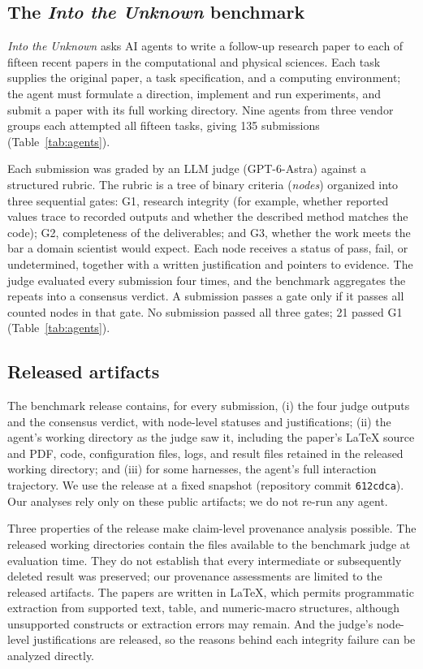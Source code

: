 \documentclass[preprint,12pt,authoryear]{elsarticle}
\begin{document}
\subsection{The \emph{Into the Unknown} benchmark}

\emph{Into the Unknown} \citep{kim2026unknown} asks AI agents to write a follow-up research paper to each of fifteen recent papers in the computational and physical sciences. Each task supplies the original paper, a task specification, and a computing environment; the agent must formulate a direction, implement and run experiments, and submit a paper with its full working directory. Nine agents from three vendor groups each attempted all fifteen tasks, giving 135 submissions (Table~\ref{tab:agents}).

Each submission was graded by an LLM judge (GPT-6-Astra) against a structured rubric. The rubric is a tree of binary criteria (\emph{nodes}) organized into three sequential gates: G1, research integrity (for example, whether reported values trace to recorded outputs and whether the described method matches the code); G2, completeness of the deliverables; and G3, whether the work meets the bar a domain scientist would expect. Each node receives a status of pass, fail, or undetermined, together with a written justification and pointers to evidence. The judge evaluated every submission four times, and the benchmark aggregates the repeats into a consensus verdict. A submission passes a gate only if it passes all counted nodes in that gate. No submission passed all three gates; 21 passed G1 (Table~\ref{tab:agents}).

\subsection{Released artifacts}

The benchmark release contains, for every submission, (i) the four judge outputs and the consensus verdict, with node-level statuses and justifications; (ii) the agent's working directory as the judge saw it, including the paper's \LaTeX{} source and PDF, code, configuration files, logs, and result files retained in the released working directory; and (iii) for some harnesses, the agent's full interaction trajectory. We use the release at a fixed snapshot (repository commit \texttt{612cdca}). Our analyses rely only on these public artifacts; we do not re-run any agent.

Three properties of the release make claim-level provenance analysis possible. The released working directories contain the files available to the benchmark judge at evaluation time. They do not establish that every intermediate or subsequently deleted result was preserved; our provenance assessments are limited to the released artifacts. The papers are written in \LaTeX{}, which permits programmatic extraction from supported text, table, and numeric-macro structures, although unsupported constructs or extraction errors may remain. And the judge's node-level justifications are released, so the reasons behind each integrity failure can be analyzed directly.
\end{document}
